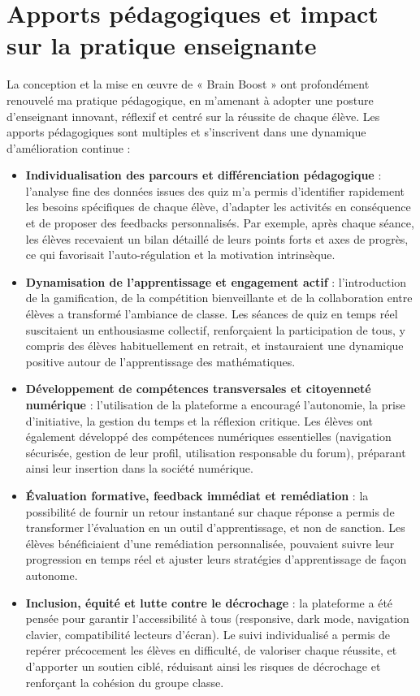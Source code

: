 \documentclass[a4paper,11pt]{report}
\begin{document}
\section{Apports pédagogiques et impact sur la pratique enseignante}
La conception et la mise en œuvre de « Brain Boost » ont profondément renouvelé ma pratique pédagogique, en m'amenant à adopter une posture d'enseignant innovant, réflexif et centré sur la réussite de chaque élève. Les apports pédagogiques sont multiples et s'inscrivent dans une dynamique d'amélioration continue :
\begin{itemize}
    \item \textbf{Individualisation des parcours et différenciation pédagogique} : l'analyse fine des données issues des quiz m'a permis d'identifier rapidement les besoins spécifiques de chaque élève, d'adapter les activités en conséquence et de proposer des feedbacks personnalisés. Par exemple, après chaque séance, les élèves recevaient un bilan détaillé de leurs points forts et axes de progrès, ce qui favorisait l'auto-régulation et la motivation intrinsèque.
    \item \textbf{Dynamisation de l'apprentissage et engagement actif} : l'introduction de la gamification, de la compétition bienveillante et de la collaboration entre élèves a transformé l'ambiance de classe. Les séances de quiz en temps réel suscitaient un enthousiasme collectif, renforçaient la participation de tous, y compris des élèves habituellement en retrait, et instauraient une dynamique positive autour de l'apprentissage des mathématiques.
    \item \textbf{Développement de compétences transversales et citoyenneté numérique} : l'utilisation de la plateforme a encouragé l'autonomie, la prise d'initiative, la gestion du temps et la réflexion critique. Les élèves ont également développé des compétences numériques essentielles (navigation sécurisée, gestion de leur profil, utilisation responsable du forum), préparant ainsi leur insertion dans la société numérique.
    \item \textbf{Évaluation formative, feedback immédiat et remédiation} : la possibilité de fournir un retour instantané sur chaque réponse a permis de transformer l'évaluation en un outil d'apprentissage, et non de sanction. Les élèves bénéficiaient d'une remédiation personnalisée, pouvaient suivre leur progression en temps réel et ajuster leurs stratégies d'apprentissage de façon autonome.
    \item \textbf{Inclusion, équité et lutte contre le décrochage} : la plateforme a été pensée pour garantir l'accessibilité à tous (responsive, dark mode, navigation clavier, compatibilité lecteurs d'écran). Le suivi individualisé a permis de repérer précocement les élèves en difficulté, de valoriser chaque réussite, et d'apporter un soutien ciblé, réduisant ainsi les risques de décrochage et renforçant la cohésion du groupe classe.
\end{itemize}
\end{document}
